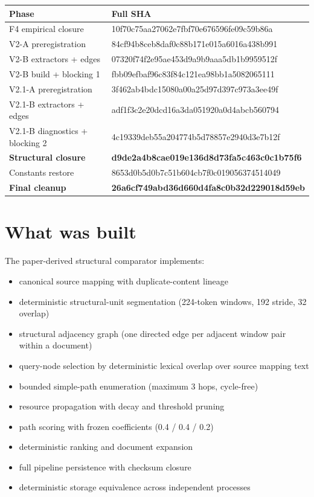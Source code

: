 \documentclass[11pt,a4paper]{article}
\begin{document}
\begin{longtable}{ll}
\toprule
Phase & Full SHA \\ \midrule
F4 empirical closure & 10f70c75aa27062e7fbf70e676596fe09c59b86a \\
V2-A preregistration & 84cf94b8ceb8daf0c88b171e015a6016a438b991 \\
V2-B extractors + edges & 07320f74f2e95ae453d9a9b9aaa5db1b9959512f \\
V2-B build + blocking 1 & fbb09efbaf96c83f84c121ea98bb1a5082065111 \\
V2.1-A preregistration & 3f462ab4bdc15080a00a25d97d397c973a3ee49f \\
V2.1-B extractors + edges & adf1f3c2e20dcd16a3da051920a0d4abcb560794 \\
V2.1-B diagnostics + blocking 2 & 4c19339deb55a204774b5d78857e2940d3e7b12f \\
\textbf{Structural closure} & \textbf{d9de2a4b8cae019e136d8d73fa5c463c0c1b75f6} \\
Constants restore & 8653d0b5d0b7c51b604cb7f0c019056374514049 \\
\textbf{Final cleanup} & \textbf{26a6cf749abd36d660d4fa8c0b32d229018d59eb} \\
\bottomrule
\end{longtable}

\section{What was built}

The paper-derived structural comparator implements:

\begin{itemize}[leftmargin=*]
    \item canonical source mapping with duplicate-content lineage
    \item deterministic structural-unit segmentation (224-token windows, 192 stride, 32 overlap)
    \item structural adjacency graph (one directed edge per adjacent window pair within a document)
    \item query-node selection by deterministic lexical overlap over source mapping text
    \item bounded simple-path enumeration (maximum 3 hops, cycle-free)
    \item resource propagation with decay and threshold pruning
    \item path scoring with frozen coefficients (0.4 / 0.4 / 0.2)
    \item deterministic ranking and document expansion
    \item full pipeline persistence with checksum closure
    \item deterministic storage equivalence across independent processes
\end{itemize}
\end{document}
